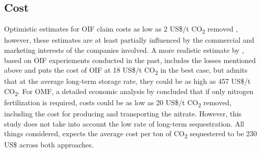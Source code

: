 \subsection*{Cost}
Optimistic estimates for OIF claim costs as low as 2 US\$/t CO\textsubscript{2} removed \parencite{Fuentes-George2017ConsensusFertilization}, however, these estimates are at least partially influenced by the commercial and marketing interests of the companies involved. A more realistic estimate by \textcite{Harrison2013AOcean}, based on OIF experiements conducted in the past, includes the losses mentioned above and puts the cost of OIF at 18 US\$/t CO\textsubscript{2} in the best case, but admits that at the average long-term storage rate, they could be as high as 457 US\$/t CO\textsubscript{2}.
For OMF, a detailed economic analysis by \textcite{S.F.Jones2014TheNourishment} concluded that if only nitrogen fertilization is required, costs could be as low as 20 US\$/t CO\textsubscript{2} removed, including the cost for producing and transporting the nitrate. However, this study does not take into account the low rate of long-term sequestration.
All things considered, \textcite{Gattuso2021TheBeyond} expects the average cost per ton of CO\textsubscript{2} sequestered to be 230 US\$ across both approaches.
